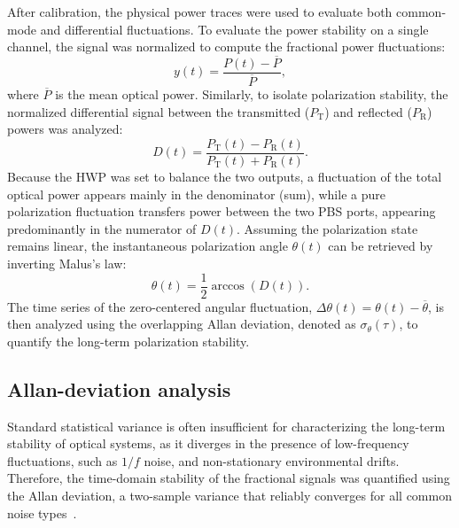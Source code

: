 After calibration, the physical power traces were used to evaluate both common-mode and differential fluctuations. To evaluate the power stability on a single channel, the signal was normalized to compute the fractional power fluctuations:
\begin{equation}
    y(t) = \frac{P(t) - \overline{P}}{\overline{P}},
\end{equation}
where $\overline{P}$ is the mean optical power. Similarly, to isolate polarization stability, the normalized differential signal between the transmitted ($P_{\mathrm{T}}$) and reflected ($P_{\mathrm{R}}$) powers was analyzed:
\begin{equation}
    D(t)
    =
    \frac{
        P_{\mathrm{T}}(t)-P_{\mathrm{R}}(t)
    }{
        P_{\mathrm{T}}(t)+P_{\mathrm{R}}(t)
    }.
    \label{eq:normalized_polarization_difference}
\end{equation}
Because the HWP was set to balance the two outputs, a fluctuation of the total optical power appears mainly in the denominator (sum), while a pure polarization fluctuation transfers power between the two PBS ports, appearing predominantly in the numerator of $D(t)$. Assuming the polarization state remains linear, the instantaneous polarization angle $\theta(t)$ can be retrieved by inverting Malus's law:
\begin{equation}
    \theta(t) = \frac{1}{2} \arccos(D(t)).
    \label{eq:polarization_angle}
\end{equation}
The time series of the zero-centered angular fluctuation, $\Delta\theta(t) = \theta(t) - \overline{\theta}$, is then analyzed using the overlapping Allan deviation, denoted as $\sigma_\theta(\tau)$, to quantify the long-term polarization stability.
\subsection{Allan-deviation analysis}

Standard statistical variance is often insufficient for characterizing the long-term stability of optical systems, as it diverges in the presence of low-frequency fluctuations, such as $1/f$ noise, and non-stationary environmental drifts. Therefore, the time-domain stability of the fractional signals was quantified using the Allan deviation, a two-sample variance that reliably converges for all common noise types~\cite{Riley2008}.

